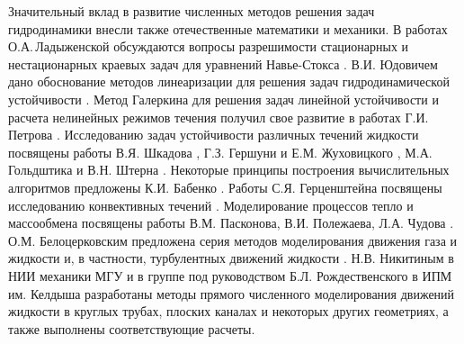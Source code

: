 Значительный вклад в развитие численных методов решения задач гидродинамики внесли также отечественные математики и механики. В работах О.А.\,Ладыженской обсуждаются вопросы разрешимости стационарных и нестационарных краевых задач для уравнений Навье-Стокса \cite{Lad1970}. В.И. Юдовичем дано обоснование методов линеаризации для решения задач гидродинамической устойчивости \cite{Jud1984}. Метод Галеркина для решения задач линейной устойчивости и расчета нелинейных режимов течения получил свое развитие в работах Г.И. Петрова \cite{Petrov1940}. Исследованию задач устойчивости различных течений жидкости посвящены работы В.Я. Шкадова \cite{Sch1973, Ach2009}, Г.З. Гершуни и Е.М. Жуховицкого \cite{Ger1972}, М.А. Гольдштика и В.Н. Штерна \cite{Gold1977}. Некоторые принципы построения вычислительных алгоритмов предложены К.И. Бабенко \cite{Bab2002}. Работы С.Я. Герценштейна посвящены исследованию конвективных течений \cite{Gerc1973, Gerc1975}. Моделирование процессов тепло и массообмена посвящены работы В.М. Пасконова, В.И. Полежаева, Л.А. Чудова \cite{Pask1984, Pol1987}. О.М. Белоцерковским предложена серия методов моделирования движения газа и жидкости и, в частности, турбулентных движений жидкости \cite{Bel1994}. Н.В. Никитиным в НИИ механики МГУ \cite{Nikitin1994a, Nikitin1994b, Nikitin1996, Nikitin2006} и в группе под руководством Б.Л. Рождественского в ИПМ им. Келдыша \cite{Rog1973, Rog1984, Pri1987, Rog1987} разработаны методы прямого численного моделирования движений жидкости в круглых трубах, плоских каналах и некоторых других геометриях, а также выполнены соответствующие расчеты. 

